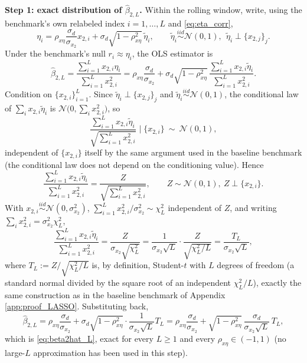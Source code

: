 \textbf{Step 1: exact distribution of $\hat\beta_{2,L}$.} Within the rolling window, write, using the
benchmark's own relabeled index $i=1,\dots,L$ and \eqref{eq:eta_corr},
\[
\eta_i = \rho_{x\eta}\frac{\sigma_d}{\sigma_{x_2}}x_{2,i} + \sigma_d\sqrt{1-\rho_{x\eta}^2}\,\tilde\eta_i,
\qquad \tilde\eta_i\stackrel{iid}{\sim}\mathcal N(0,1),\ \ \tilde\eta_i\perp\{x_{2,j}\}_{j}.
\]
Under the benchmark's null $r_i\approx\eta_i$, the OLS estimator is
\[
\hat\beta_{2,L} = \frac{\sum_{i=1}^L x_{2,i}\eta_i}{\sum_{i=1}^L x_{2,i}^2}
= \rho_{x\eta}\frac{\sigma_d}{\sigma_{x_2}} + \sigma_d\sqrt{1-\rho_{x\eta}^2}\,
\frac{\sum_{i=1}^L x_{2,i}\tilde\eta_i}{\sum_{i=1}^L x_{2,i}^2}.
\]
Condition on $\{x_{2,i}\}_{i=1}^L$. Since $\tilde\eta_i\perp\{x_{2,j}\}_j$ and $\tilde\eta_i\stackrel{
iid}{\sim}\mathcal N(0,1)$, the conditional law of $\sum_i x_{2,i}\tilde\eta_i$ is $\mathcal N\bigl(0,
\sum_i x_{2,i}^2\bigr)$, so
\[
\frac{\sum_{i=1}^L x_{2,i}\tilde\eta_i}{\sqrt{\sum_{i=1}^L x_{2,i}^2}} \;\Big|\; \{x_{2,i}\} \ \sim\
\mathcal N(0,1),
\]
independent of $\{x_{2,i}\}$ itself by the same argument used in the baseline benchmark (the conditional
law does not depend on the conditioning value). Hence
\[
\frac{\sum_{i=1}^L x_{2,i}\tilde\eta_i}{\sum_{i=1}^L x_{2,i}^2} = \frac{Z}{\sqrt{\sum_{i=1}^L x_{2,i}^2}},
\qquad Z\sim\mathcal N(0,1),\ Z\perp\{x_{2,i}\}.
\]
With $x_{2,i}\stackrel{iid}{\sim}\mathcal N(0,\sigma_{x_2}^2)$, $\sum_{i=1}^L x_{2,i}^2/\sigma_{x_2}^2
\sim\chi^2_L$ independent of $Z$, and writing $\sum_i x_{2,i}^2=\sigma_{x_2}^2\chi^2_L$,
\[
\frac{\sum_{i=1}^L x_{2,i}\tilde\eta_i}{\sum_{i=1}^L x_{2,i}^2}
= \frac{Z}{\sigma_{x_2}\sqrt{\chi^2_L}}
= \frac{1}{\sigma_{x_2}\sqrt L}\cdot\frac{Z}{\sqrt{\chi^2_L/L}}
= \frac{T_L}{\sigma_{x_2}\sqrt L},
\]
where $T_L:=Z/\sqrt{\chi^2_L/L}$ is, by definition, Student-$t$ with $L$ degrees of freedom (a standard
normal divided by the square root of an independent $\chi^2_L/L$), exactly the same construction as in
the baseline benchmark of Appendix \ref{app:proof_LASSO}. Substituting back,
\[
\hat\beta_{2,L} = \rho_{x\eta}\frac{\sigma_d}{\sigma_{x_2}} + \sigma_d\sqrt{1-\rho_{x\eta}^2}\cdot
\frac{1}{\sigma_{x_2}\sqrt L}T_L = \rho_{x\eta}\frac{\sigma_d}{\sigma_{x_2}} +
\sqrt{1-\rho_{x\eta}^2}\,\frac{\sigma_d}{\sigma_{x_2}\sqrt L}\,T_L,
\]
which is \eqref{eq:beta2hat_L}, exact for every $L\geq1$ and every $\rho_{x\eta}\in(-1,1)$ (no
large-$L$ approximation has been used in this step).

